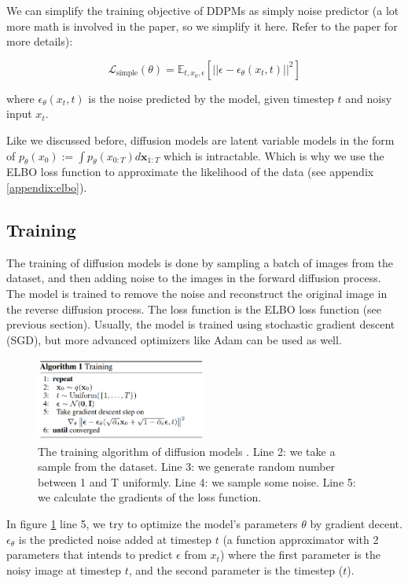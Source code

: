 We can simplify the training objective of DDPMs as simply noise predictor (a lot more math is involved in the paper, so we simplify it here. Refer to the paper for more details):

\begin{equation}
    \boxed{\mathcal{L}_\text{simple} (\theta) = \mathbb{E}_{t,x_0, \epsilon} \left[ \left| \left| \epsilon - \epsilon_\theta (x_t, t) \right| \right|^2 \right]}
    \label{eq:ddpm_loss}
\end{equation}

where $\epsilon_\theta (x_t, t)$ is the noise predicted by the model, given timestep $t$ and noisy input $x_t$.

Like we discussed before, diffusion models are latent variable models in the form of $p_\theta (x_0) := \int p_\theta(x_{0:T}) d\mathbf{x}_{1:T}$ which is intractable. Which is why we use the ELBO loss function to approximate the likelihood of the data (see appendix \ref{appendix:elbo}).






\subsection{Training}

The training of diffusion models is done by sampling a batch of images from the dataset, and then adding noise to the images in the forward diffusion process. The model is trained to remove the noise and reconstruct the original image in the reverse diffusion process. The loss function is the ELBO loss function (see previous section). Usually, the model is trained using stochastic gradient descent (SGD), but more advanced optimizers like Adam can be used as well.

\begin{figure}
    \centering
    \includegraphics[width=0.5\textwidth]{images/diffusion_models/training.png}
    \caption{The training algorithm of diffusion models \cite{ddpm}. Line 2: we take a sample from the dataset. Line 3: we generate random number between 1 and T uniformly. Line 4: we sample some noise. Line 5: we calculate the gradients of the loss function.}
    \label{fig:ddpm_training}
\end{figure}

In figure \ref{fig:ddpm_training} line 5, we try to optimize the model's parameters $\theta$ by gradient decent. $\epsilon_\theta$ is the predicted noise added at timestep $t$ (a function approximator with 2 parameters that intends to predict $\epsilon$ from $x_t$) where the first parameter is the noisy image at timestep $t$, and the second parameter is the timestep ($t$). 







